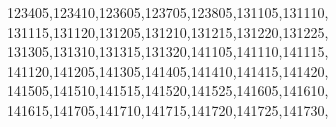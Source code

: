 \documentclass[
  12,
  dvipsnames]{article}
\newenvironment{Shaded}{\begin{snugshade}}{\end{snugshade}}
\newcommand{\NormalTok}[1]{#1}
\newcommand{\StringTok}[1]{\textcolor[rgb]{0.31,0.60,0.02}{#1}}
\begin{document}
\begin{Shaded}
\begin{Highlighting}[]
                  \StringTok{\textquotesingle{}123405\textquotesingle{}}\NormalTok{,}\StringTok{\textquotesingle{}123410\textquotesingle{}}\NormalTok{,}\StringTok{\textquotesingle{}123605\textquotesingle{}}\NormalTok{,}\StringTok{\textquotesingle{}123705\textquotesingle{}}\NormalTok{,}\StringTok{\textquotesingle{}123805\textquotesingle{}}\NormalTok{,}\StringTok{\textquotesingle{}131105\textquotesingle{}}\NormalTok{,}\StringTok{\textquotesingle{}131110\textquotesingle{}}\NormalTok{,}
                  \StringTok{\textquotesingle{}131115\textquotesingle{}}\NormalTok{,}\StringTok{\textquotesingle{}131120\textquotesingle{}}\NormalTok{,}\StringTok{\textquotesingle{}131205\textquotesingle{}}\NormalTok{,}\StringTok{\textquotesingle{}131210\textquotesingle{}}\NormalTok{,}\StringTok{\textquotesingle{}131215\textquotesingle{}}\NormalTok{,}\StringTok{\textquotesingle{}131220\textquotesingle{}}\NormalTok{,}\StringTok{\textquotesingle{}131225\textquotesingle{}}\NormalTok{,}
                  \StringTok{\textquotesingle{}131305\textquotesingle{}}\NormalTok{,}\StringTok{\textquotesingle{}131310\textquotesingle{}}\NormalTok{,}\StringTok{\textquotesingle{}131315\textquotesingle{}}\NormalTok{,}\StringTok{\textquotesingle{}131320\textquotesingle{}}\NormalTok{,}\StringTok{\textquotesingle{}141105\textquotesingle{}}\NormalTok{,}\StringTok{\textquotesingle{}141110\textquotesingle{}}\NormalTok{,}\StringTok{\textquotesingle{}141115\textquotesingle{}}\NormalTok{,}
                  \StringTok{\textquotesingle{}141120\textquotesingle{}}\NormalTok{,}\StringTok{\textquotesingle{}141205\textquotesingle{}}\NormalTok{,}\StringTok{\textquotesingle{}141305\textquotesingle{}}\NormalTok{,}\StringTok{\textquotesingle{}141405\textquotesingle{}}\NormalTok{,}\StringTok{\textquotesingle{}141410\textquotesingle{}}\NormalTok{,}\StringTok{\textquotesingle{}141415\textquotesingle{}}\NormalTok{,}\StringTok{\textquotesingle{}141420\textquotesingle{}}\NormalTok{,}
                  \StringTok{\textquotesingle{}141505\textquotesingle{}}\NormalTok{,}\StringTok{\textquotesingle{}141510\textquotesingle{}}\NormalTok{,}\StringTok{\textquotesingle{}141515\textquotesingle{}}\NormalTok{,}\StringTok{\textquotesingle{}141520\textquotesingle{}}\NormalTok{,}\StringTok{\textquotesingle{}141525\textquotesingle{}}\NormalTok{,}\StringTok{\textquotesingle{}141605\textquotesingle{}}\NormalTok{,}\StringTok{\textquotesingle{}141610\textquotesingle{}}\NormalTok{,}
                  \StringTok{\textquotesingle{}141615\textquotesingle{}}\NormalTok{,}\StringTok{\textquotesingle{}141705\textquotesingle{}}\NormalTok{,}\StringTok{\textquotesingle{}141710\textquotesingle{}}\NormalTok{,}\StringTok{\textquotesingle{}141715\textquotesingle{}}\NormalTok{,}\StringTok{\textquotesingle{}141720\textquotesingle{}}\NormalTok{,}\StringTok{\textquotesingle{}141725\textquotesingle{}}\NormalTok{,}\StringTok{\textquotesingle{}141730\textquotesingle{}}\NormalTok{,}

\end{Highlighting}
\end{Shaded}
\end{document}
